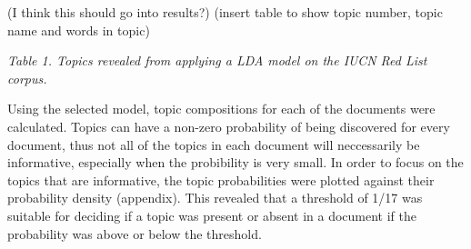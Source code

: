 (I think this should go into results?)
(insert table to show topic number, topic name and words in topic)

\textit{Table 1. Topics revealed from applying a LDA model on the IUCN Red List corpus.}

Using the selected model, topic compositions for each of the documents were calculated. Topics can have a non-zero probability of being discovered for every document, thus not all of the topics in each document will neccessarily be informative, especially when the probibility is very small. In order to focus on the topics that are informative, the topic probabilities were plotted against their probability density (appendix). This revealed that a threshold of 1/17 was suitable for deciding if a topic was present or absent in a document if the probability was above or below the threshold.